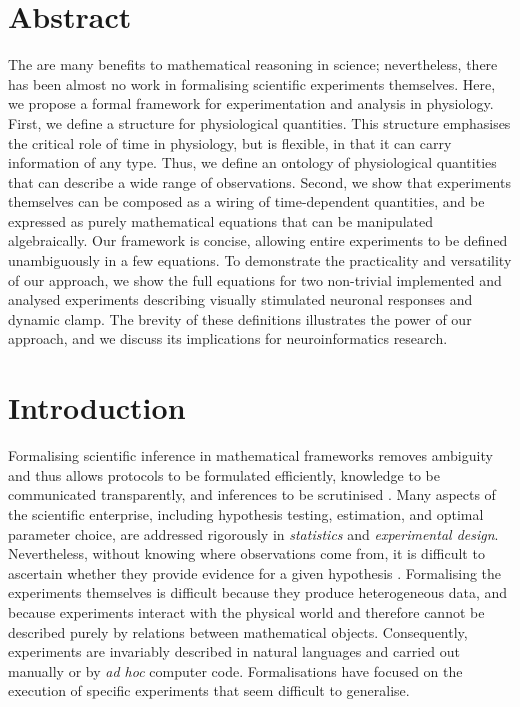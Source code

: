 \section*{Abstract}

The are many benefits to mathematical reasoning in science;
nevertheless, there has been almost no work in formalising scientific
experiments themselves. Here, we propose a formal framework for
experimentation and analysis in physiology. First, we define a
structure for physiological quantities. This structure emphasises the
critical role of time in physiology, but is flexible, in that it can
carry information of any type. Thus, we define an ontology of
physiological quantities that can describe a wide range of
observations. Second, we show that experiments themselves can be
composed as a wiring of time-dependent quantities, and be expressed as
purely mathematical equations that can be manipulated
algebraically. Our framework is concise, allowing entire experiments
to be defined unambiguously in a few equations. To demonstrate the
practicality and versatility of our approach, we show the full
equations for two non-trivial implemented and analysed experiments
describing visually stimulated neuronal responses and dynamic
clamp. The brevity of these definitions illustrates the power of our
approach, and we discuss its implications for neuroinformatics
research.

\section*{Introduction}

Formalising scientific inference in mathematical frameworks removes
ambiguity and thus allows protocols to be formulated efficiently,
knowledge to be communicated transparently, and inferences to be
scrutinised \citep{Soldatova2006, Jaynes2003, Krantz1971}. Many
aspects of the scientific enterprise, including hypothesis testing,
estimation, and optimal parameter choice, are addressed rigorously in
\emph{statistics} and \emph{experimental design}. Nevertheless,
without knowing where observations come from, it is difficult to
ascertain whether they provide evidence for a given hypothesis
\citep{Tukey1962}. Formalising the experiments themselves is difficult
because they produce heterogeneous data, and because experiments
interact with the physical world and therefore cannot be described
purely by relations between mathematical objects. Consequently,
experiments are invariably described in natural languages and carried
out manually or by \emph{ad hoc} computer code. Formalisations have
focused on the execution of specific experiments \citep{Jenkins1989,
  Manduchi1990, King2004} that seem difficult to generalise.

